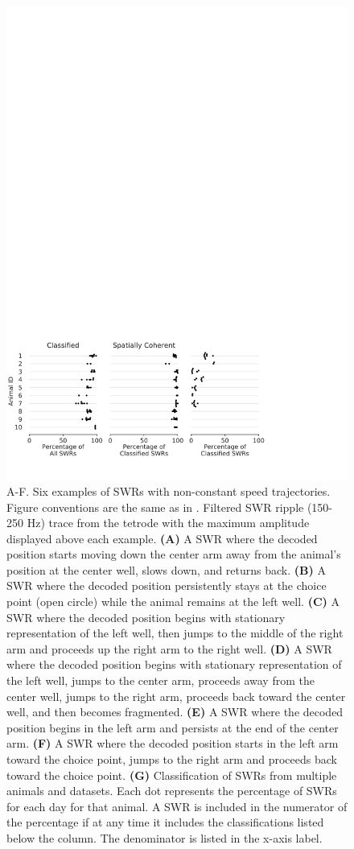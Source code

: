 \documentclass[9pt,lineno]{elife}
\begin{document}
\begin{figure}
\includegraphics[width=0.8\linewidth]{figures/Figure3/Figure3_v5}
\caption{A-F. Six examples of SWRs with non-constant speed trajectories. Figure conventions are the same as in . Filtered SWR ripple (150-250 Hz) trace from the tetrode with the maximum amplitude displayed above each example. \textbf{(A)} A SWR where the decoded position starts moving down the center arm away from the animal's position at the center well, slows down, and returns back. \textbf{(B)} A SWR where the decoded position persistently stays at the choice point (open circle) while the animal remains at the left well. \textbf{(C)} A SWR where the decoded position begins with stationary representation of the left well, then jumps to the middle of the right arm and proceeds up the right arm to the right well. \textbf{(D)} A SWR where the decoded position begins with stationary representation of the left well, jumps to the center arm, proceeds away from the center well, jumps to the right arm, proceeds back toward the center well, and then becomes fragmented. \textbf{(E)} A SWR where the decoded position begins in the left arm and persists at the end of the center arm. \textbf{(F)} A SWR where the decoded position starts in the left arm toward the choice point, jumps to the right arm and proceeds back toward the choice point. \textbf{(G)} Classification of SWRs from multiple animals and datasets. Each dot represents the percentage of SWRs for each day for that animal. A SWR is included in the numerator of the percentage if at any time it includes the classifications listed below the column. The denominator is listed in the x-axis label.
}
\label{fig:3}


\end{figure}
\end{document}
